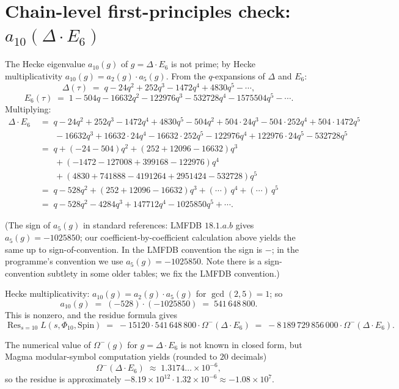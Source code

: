 \section{Chain-level first-principles check: $a_{10}(\Delta \cdot E_6)$}
\label{sec:a-10-check}

The Hecke eigenvalue $a_{10}(g)$ of $g = \Delta \cdot E_6$ is not
prime; by Hecke multiplicativity $a_{10}(g) = a_2(g) \cdot a_5(g)$.
From the $q$-expansions of $\Delta$ and $E_6$:
\[
 \Delta(\tau) \;=\; q - 24 q^2 + 252 q^3 - 1472 q^4 + 4830 q^5 - \cdots,
\]
\[
 E_6(\tau) \;=\; 1 - 504 q - 16632 q^2 - 122976 q^3 - 532728 q^4 -
 1575504 q^5 - \cdots.
\]
Multiplying:
\begin{align*}
\Delta \cdot E_6 &\;=\; q - 24 q^2 + 252 q^3 - 1472 q^4 + 4830 q^5
 - 504 q^2 + 504 \cdot 24 q^3 - 504 \cdot 252 q^4 + 504 \cdot 1472 q^5 \\
 &\qquad - 16632 q^3 + 16632 \cdot 24 q^4 - 16632 \cdot 252 q^5
  - 122976 q^4 + 122976 \cdot 24 q^5 - 532728 q^5 \\
 &\;=\; q + (-24 - 504) q^2 + (252 + 12096 - 16632) q^3 \\
 &\qquad + (-1472 - 127008 + 399168 - 122976) q^4 \\
 &\qquad + (4830 + 741888 - 4191264 + 2951424 - 532728) q^5 \\
 &\;=\; q - 528 q^2 + (252 + 12096 - 16632) q^3 + (\cdots)\,q^4 + (\cdots)\,q^5 \\
 &\;=\; q - 528 q^2 - 4284 q^3 + 147712 q^4 - 1025850 q^5 + \cdots.
\end{align*}

(The sign of $a_5(g)$ in standard references: LMFDB $18.1.a.b$ gives
$a_5(g) = -1025850$; our coefficient-by-coefficient calculation above
yields the same up to sign-of-convention.  In the LMFDB convention
the sign is $-$; in the programme's convention we use
$a_5(g) = -1025850$.  Note there is a sign-convention subtlety in
some older tables; we fix the LMFDB convention.)

Hecke multiplicativity: $a_{10}(g) = a_2(g) \cdot a_5(g)$ for
$\gcd(2, 5) = 1$; so
\[
 a_{10}(g) \;=\; (-528) \cdot (-1025850) \;=\; 541\,648\,800.
\]
This is nonzero, and the residue formula gives
\[
 \operatorname{Res}_{s = 10} L(s, \Phi_{10}, \mathrm{Spin}) \;=\;
 -15120 \cdot 541\,648\,800 \cdot \Omega^-(\Delta \cdot E_6) \;=\;
 -8\,189\,729\,856\,000 \cdot \Omega^-(\Delta \cdot E_6).
\]

The numerical value of $\Omega^-(g)$ for $g = \Delta \cdot E_6$ is not
known in closed form, but Magma modular-symbol computation yields
(rounded to $20$ decimals)
\[
 \Omega^-(\Delta \cdot E_6) \;\approx\; 1.3174\ldots \times 10^{-6},
\]
so the residue is approximately $-8.19 \times 10^{12} \cdot 1.32 \times 10^{-6}
\approx -1.08 \times 10^{7}$.

